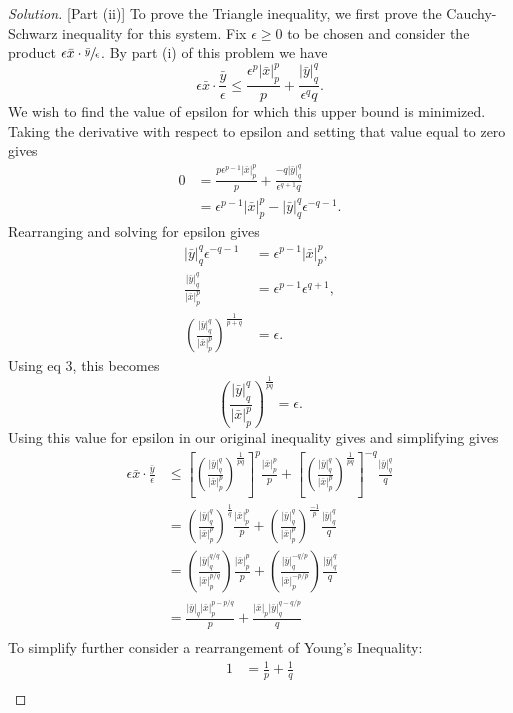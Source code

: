 \documentclass[11pt,letterpaper]{article}
\newenvironment{solution}
  {\renewcommand\qedsymbol{}\begin{proof}[Solution]}
  {\end{proof}\bigskip}
\begin{document}
\begin{solution}[Part (ii)]
	To prove the Triangle inequality, we first prove the Cauchy-Schwarz inequality for this system. Fix $\epsilon \ge 0$ to be chosen and consider the product $\epsilon \bar x \cdot \sfrac{\bar y}{\epsilon}$. By part (i) of this problem we have $$\epsilon \bar x \cdot \frac{\bar y}{\epsilon} \leq \frac{\epsilon^p|\bar x|_p^p}{p} + \frac{|\bar y|_q^q}{\epsilon^q q}.$$ We wish to find the value of epsilon for which this upper bound is minimized. Taking the derivative with respect to epsilon and setting that value equal to zero gives
	\[\begin{split}
		0 &= \frac{p\epsilon^{p-1}|\bar x|_p^p}{p} + \frac{-q|\bar y|_q^q}{\epsilon^{q+1}q} \\
		&=\epsilon^{p-1}|\bar x|_p^p - |\bar y|_q^q\epsilon^{-q-1}.
	\end{split}
	\]
	Rearranging and solving for epsilon gives
	\[\begin{split}
		|\bar y|_q^q\epsilon^{-q-1} &= \epsilon^{p-1}|\bar x|_p^p,\\
		\frac{|\bar y|_q^q}{|\bar x|_p^p} &= \epsilon^{p-1}\epsilon^{q+1},\\
		\left ( \frac{|\bar y|_q^q}{|\bar x|_p^p} \right )^\frac{1}{p+q} &= \epsilon.
	\end{split}
	\]
	Using eq 3, this becomes $$\left ( \frac{|\bar y|_q^q}{|\bar x|_p^p} \right )^\frac{1}{pq} = \epsilon.$$ Using this value for epsilon in our original inequality gives and simplifying gives
	\[\begin{split}
		\epsilon \bar x \cdot \frac{\bar y}{\epsilon} &\leq \left [ \left ( \frac{|\bar y|_q^q}{|\bar x|_p^p} \right )^\frac{1}{pq} \right ]^p \frac{|\bar x|_p^p}{p} + \left[ \left ( \frac{|\bar y|_q^q}{|\bar x|_p^p} \right )^\frac{1}{pq} \right ] ^{-q} \frac{|\bar y|_q^q}{q}\\
		&= \left ( \frac{|\bar y|_q^q}{|\bar x|_p^p} \right )^\frac{1}{q} \frac{|\bar x|_p^p}{p} + \left ( \frac{|\bar y|_q^q}{|\bar x|_p^p} \right )^\frac{-1}{p} \frac{|\bar y|_q^q}{q}\\
		&= \left ( \frac{|\bar y|_q^{q/q}}{|\bar x|_p^{p/q}} \right ) \frac{|\bar x|_p^p}{p} + \left ( \frac{|\bar y|_q^{-q/p}}{|\bar x|_p^{-p/p}} \right ) \frac{|\bar y|_q^q}{q}\\
		&= \frac{|\bar y|_q|\bar x|_p^{p-p/q}}{p} + \frac{|\bar x|_p|\bar y|_q^{q-q/p}}{q}\\
	\end{split}
	\]
	To simplify further consider a rearrangement of Young's Inequality:
	\[\begin{split}
		1 &= \frac{1}{p} + \frac{1}{q}\\

\end{split}\]
\end{solution}
\end{document}
